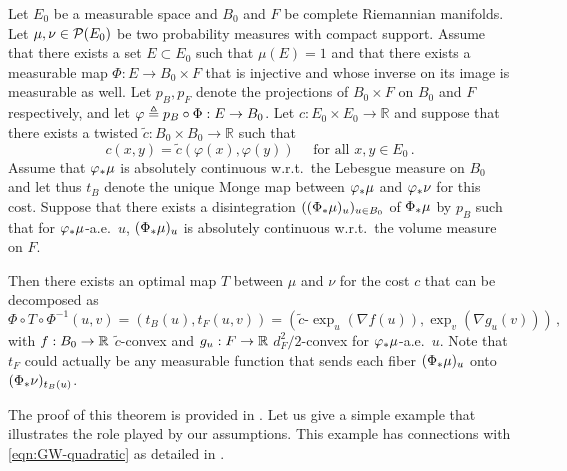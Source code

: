 \begin{theorem}
    \label{theo:fibers-main}
    Let $E_0$ be a measurable space and $B_0$ and $F$ be complete Riemannian manifolds.
    Let $\mu,\nu \in \mathcal{P}(E_0)$ be two probability measures with compact support.
    Assume that there exists a set $E\subset E_0$ such that $\mu(E) = 1$ and that there exists a measurable map $\Phi : E \to B_0 \times F$ that is injective and whose inverse on its image is measurable as well.
    Let $p_B, p_F$ denote the projections of $B_0 \times F$ on $B_0$ and $F$ respectively, and
    let $\varphi\triangleq p_ B \circ \Phi: E\to B_0$.
    Let $c: E_0 \times E_0 \to \mathbb{R}$ and suppose that there exists a twisted $\tilde c: B_0 \times B_0 \to \mathbb{R}$ such that
    \[ c(x,y)=\tilde c(\varphi(x),\varphi(y))\quad \text{ for all } x,y\in E_0\,.\]
    Assume that $\varphi_*\mu$ is absolutely continuous w.r.t.~the Lebesgue measure on $B_0$ and let thus $t_B$ denote the unique Monge map between $\varphi_*\mu$ and $\varphi_*\nu$ for this cost.
    Suppose that there exists a disintegration $((\Phi_*\mu)_u)_{u\in B_0}$ of $\Phi_*\mu$ by $p_B$ such that for $\varphi_*\mu$-a.e.~$u$, $(\Phi_*\mu)_{u}$ is absolutely continuous w.r.t.~the volume measure on $F$.

    \noindent Then there exists an optimal map $T$ between $\mu$ and $\nu$ for the cost $c$ that can be decomposed as
    \begin{equation}\label{eq:structureMongeMap}
    \Phi \circ T\circ \Phi^{-1}(u,v)=(t_ B (u),t_ F (u,v))=(\tilde c\text{-}\exp_u(\nabla f(u)), \exp_v(\nabla g_u(v)))\,,
    \end{equation}
    with $f: B_0 \to\mathbb{R}$ $\tilde c$-convex and $g_u: F \to\mathbb{R}$ $d_ F ^2/2$-convex for $\varphi_*\mu$-a.e.~$u$.
    Note that $t_ F$ could actually be any measurable function that sends each fiber $(\Phi_*\mu)_u$ onto $(\Phi_*\nu)_{t_ B (u)}$.
\end{theorem}
The proof of this theorem is provided in .
Let us give a simple example that illustrates the role played by our assumptions.
This example has connections with \eqref{eqn:GW-quadratic} as detailed in .

